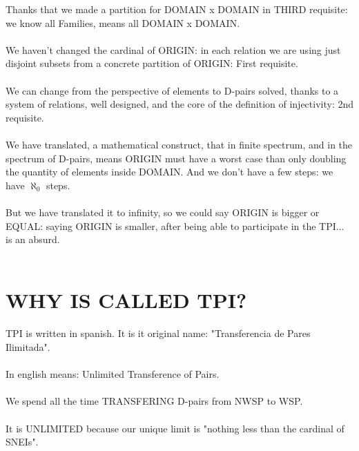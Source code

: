 		\noindent
		Thanks that we made a partition for DOMAIN x DOMAIN in THIRD requisite: we know all Families, means all DOMAIN x DOMAIN.
		\\\\
		
		\noindent
		We haven't changed the cardinal of ORIGIN: in each relation we are using just disjoint subsets from a concrete partition of ORIGIN: First requisite.
		\\\\
		
		\noindent
		We can change from the perspective of elements to D-pairs solved, thanks to a system of relations, well designed, and the core of the definition of injectivity: 2nd requisite.
		\\\\
		
		\noindent
		We have translated, a mathematical construct, that in finite spectrum, and in the spectrum of D-pairs, means ORIGIN must have a worst case than only doubling the quantity of elements inside DOMAIN. And we don't have a few steps: we have $\aleph_{0}$ steps.
		\\\\
		
		\noindent
		But we have translated it to infinity, so we could say ORIGIN is bigger or EQUAL: saying ORIGIN is smaller, after being able to participate in the TPI... is an absurd.
		\\\\
		
	\section{WHY IS CALLED TPI?}
	
		\noindent
		TPI is written in spanish. It is it original name: "Transferencia de Pares Ilimitada".
		\\\\
		
		\noindent
		In english means: Unlimited Transference of Pairs.
		\\\\
		
		\noindent
		We spend all the time TRANSFERING D-pairs from NWSP to WSP.
		\\\\
		
		\noindent
		It is UNLIMITED because our unique limit is "nothing less than the cardinal of SNEIs".
		\\\\
		
		